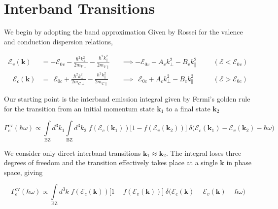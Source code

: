 \newpage
\section{Interband Transitions}
\label{app:quadratic_interband_transitions}

We begin by adopting the band approximation Given by Rossei for the valence and conduction dispersion relations,

\begin{align}
\mathcal{E}_{v}(\mathbf{k})&=-\mathcal{E}_{0v} - \frac{{\hbar ^{2}k_{\perp}^{2}}}{2m_{V \perp}} - \frac{{\hbar ^{2}k_{\parallel}^{2}}}{2m_{V \parallel}} &&\implies-\mathcal{E}_{0 v}-A_{v}k_{\perp}^{2}-B_{v}k_{\parallel}^{2}  &&&(\mathcal{E}<\mathcal{E}_{0v})\\
\ \ \ \mathcal{E}_{c}(\mathbf{k})&= \ \ \mathcal{E}_{0 c} + \frac{{\hbar ^{2}k_{\perp}^{2}}}{2m_{C \perp}} - \frac{{\hbar ^{2}k_{\parallel}^{2}}}{2m_{C \parallel}} && \implies \ \ \mathcal{E}_{0 c}+A_{c}k_{\perp}^{2}-B_{c}k_{\parallel}^{2} &&&(\mathcal{E}>\mathcal{E}_{0c})
\label{eq:quadratic_interband_bands}
\end{align}

Our starting point is the interband emission integral given by Fermi's golden rule for the transition from an initial momentum state $\mathbf{k}_{1}$ to a final state $\mathbf{k}_{2}$

\begin{equation}
\Gamma_{e}^{\text{cv}}(\hbar\omega) \propto\int\limits_{\text{BZ}} d^{3}k_{1} \int\limits_{\text{BZ}} d^{3}k_{2} \; f(\mathcal{E}_{c}(\mathbf{k}_{1})) \Big[1-f(\mathcal{E}_{v}(\mathbf{k}_{2}))\Big] \; \delta\Big(\mathcal{E}_{c}(\mathbf{k}_{1}) - \mathcal{E}_{v}(\mathbf{k}_{2}) - \hbar\omega  \Big)
\label{eq:quadratic_interband_double_integral}
\end{equation}

We consider only direct interband transitions $\mathbf{k}_{1}\approx\mathbf{k}_{2}$. The integral loses three degrees of freedom and the transition effectively takes place at a single $\mathbf{k}$ in phase space, giving

\begin{equation}
\Gamma_{e}^{\text{cv}}(\hbar\omega) \propto\int\limits_{\text{BZ}} d^{3}k \; f(\mathcal{E}_{c}(\mathbf{k})) \Big[1-f(\mathcal{E}_{v}(\mathbf{k}))\Big] \; \delta\Big(\mathcal{E}_{c}(\mathbf{k}) - \mathcal{E}_{v}(\mathbf{k}) - \hbar\omega  \Big)
\label{eq:quadratic_interband_single_integral}
\end{equation}

